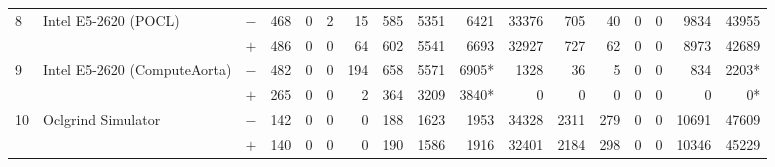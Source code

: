 \begin{tabular}{lll | rrrrrrr | rrrrrrr }
\hline
\multirow{ 2}{*}{8} & \multirow{ 2}{*}{Intel E5-2620 (POCL)} & $-$ & 468 & 0 & 2 & 15 & 585 & 5351 & 6421       & 33376 & 705 & 40 & 0 & 0 & 9834 & 43955 \\& & $+$ & 486 & 0 & 0 & 64 & 602 & 5541 & 6693 & 32927 & 727 & 62 & 0 & 0 & 8973 & 42689 \\
\hline
\multirow{ 2}{*}{9} & \multirow{ 2}{*}{Intel E5-2620 (ComputeAorta)} & $-$ & 482 & 0 & 0 & 194 & 658 & 5571 & 6905*       & 1328 & 36 & 5 & 0 & 0 & 834 & 2203* \\& & $+$ & 265 & 0 & 0 & 2 & 364 & 3209 & 3840* & 0 & 0 & 0 & 0 & 0 & 0 & 0* \\
\hline
\multirow{ 2}{*}{10} & \multirow{ 2}{*}{Oclgrind Simulator} & $-$ & 142 & 0 & 0 & 0 & 188 & 1623 & 1953       & 34328 & 2311 & 279 & 0 & 0 & 10691 & 47609 \\& & $+$ & 140 & 0 & 0 & 0 & 190 & 1586 & 1916 & 32401 & 2184 & 298 & 0 & 0 & 10346 & 45229 \\
  \bottomrule
\end{tabular}

